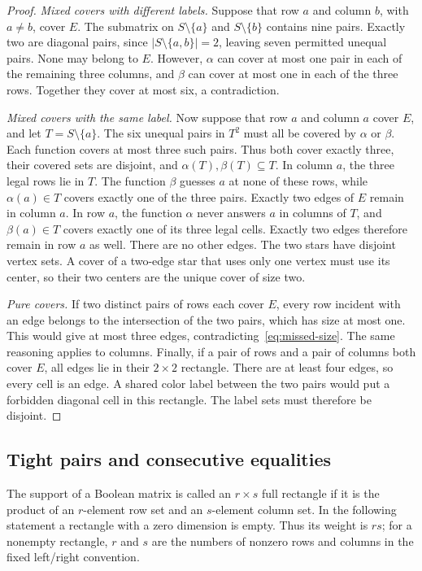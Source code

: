 \begin{proof}
\emph{Mixed covers with different labels.}
Suppose that row $a$ and column $b$, with $a\ne b$, cover $E$. The submatrix
on $S\setminus\{a\}$ and $S\setminus\{b\}$ contains nine pairs. Exactly two
are diagonal pairs, since $|S\setminus\{a,b\}|=2$, leaving seven permitted
unequal pairs. None may belong to $E$. However, $\alpha$ can cover at most
one pair in each of the remaining three columns, and $\beta$ can cover at
most one in each of the three rows. Together they cover at most six, a
contradiction.

\emph{Mixed covers with the same label.}
Now suppose that row $a$ and column $a$ cover $E$, and let
$T=S\setminus\{a\}$. The six unequal pairs in $T^2$ must all be covered
by $\alpha$ or $\beta$. Each function covers at most three such pairs.
Thus both cover exactly three, their covered sets are disjoint, and
$\alpha(T),\beta(T)\subseteq T$. In column $a$, the three legal rows lie
in $T$. The function $\beta$ guesses $a$ at none of these rows, while
$\alpha(a)\in T$ covers exactly one of the three pairs. Exactly two edges
of $E$ remain in column $a$. In row $a$, the function $\alpha$ never
answers $a$ in columns of $T$, and $\beta(a)\in T$ covers exactly one
of its three legal cells. Exactly two edges therefore remain in row $a$
as well. There are no other edges. The two stars have disjoint
vertex sets. A cover of a two-edge star that uses only one vertex must use
its center, so their two centers are the unique cover of size two.

\emph{Pure covers.}
If two distinct pairs of rows each cover $E$, every row incident with an
edge belongs to the intersection of the two pairs, which has size at most
one. This would give at most three edges, contradicting~\eqref{eq:missed-size}.
The same reasoning applies to columns. Finally, if a pair of rows and a
pair of columns both cover $E$, all edges lie in their $2\times2$ rectangle.
There are at least four edges, so every cell is an edge. A shared color
label between the two pairs would put a forbidden diagonal cell in this
rectangle. The label sets must therefore be disjoint.
\end{proof}

\subsection{Tight pairs and consecutive equalities}
The support of a Boolean matrix is called an $r\times s$ full rectangle
if it is the product of an $r$-element row set and an $s$-element column
set. In the following statement a rectangle with a zero dimension is empty.
Thus its weight is $rs$; for a nonempty rectangle, $r$ and $s$ are the
numbers of nonzero rows and columns in the fixed left/right convention.

